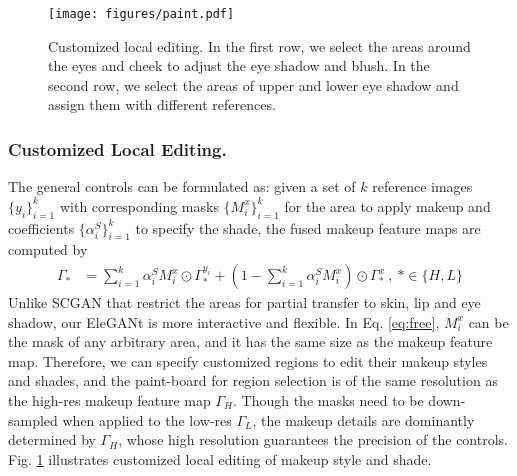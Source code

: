 \begin{figure}[t]
    \setlength{\abovedisplayskip}{0cm}
    \setlength{\abovecaptionskip}{-0.1cm}
    \setlength{\belowcaptionskip}{-0.2cm}
    \centering
    \texttt{[image: figures/paint.pdf]}    \caption{Customized local editing. In the first row, we select the areas around the eyes and cheek to adjust the eye shadow and blush. In the second row, we select the areas of upper and lower eye shadow and assign them with different references.}
    \label{fig:paint}
\end{figure}
\subsubsection{Customized Local Editing.}
The general controls can be formulated as: given a set of $k$ reference images $\{y_i\}_{i=1}^k$ with corresponding masks $\{M_i^x\}_{i=1}^k$ for the area to apply makeup and coefficients $\{\alpha^S_i\}_{i=1}^k$ to specify the shade, the fused makeup feature maps are computed by 
\begin{equation}
\label{eq:free}
\begin{aligned}
\Gamma_* &= \sum_{i=1}^k \alpha^S_i M_i^x\odot \Gamma_*^{y_i} + \left(1-\sum_{i=1}^k \alpha^S_i M_i^x\right)\odot\Gamma_*^x\ ,\ *\in\{H,L\}
\end{aligned}
\end{equation}
Unlike %
SCGAN \cite{SCGAN} that restrict the areas for partial transfer to skin, lip and eye shadow, our EleGANt is more interactive and flexible. In Eq. \ref{eq:free}, $M_i^x$ can be the mask of any arbitrary area, and it has the same size as the makeup feature map. Therefore, we can specify customized regions to edit their makeup styles and shades, and the paint-board for region selection is of the same resolution as the high-res makeup feature map $\Gamma_H$. Though the masks need to be down-sampled when applied to the low-res $\Gamma_L$, the makeup details are dominantly determined by $\Gamma_H$, whose high resolution guarantees the precision of the controls. Fig. \ref{fig:paint} illustrates customized local editing of makeup style and shade. 

